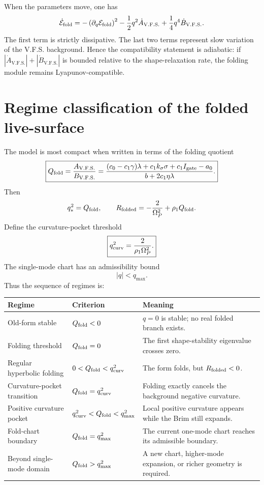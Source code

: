 \documentclass[11pt,a4paper]{article}
\newcommand{\VFS}{\ensuremath{\mathrm{V.F.S.}}}
\newcommand{\Op}{\Omega_P}
\newcommand{\Igate}{I_{\rm gate}}
\theoremstyle{plain}
\theoremstyle{remark}
\theoremstyle{definition}
\begin{document}
When the parameters move, one has
\[
\dot{\mathcal E}_{\rm fold}
=
-\left(\partial_q\mathcal E_{\rm fold}\right)^2
-\frac12q^2\dot A_{\VFS}
+\frac14q^4\dot B_{\VFS}.
\]
The first term is strictly dissipative. The last two terms represent slow variation of the V.F.S.
background. Hence the compatibility statement is adiabatic: if $|\dot A_{\VFS}|+|\dot B_{\VFS}|$ is
bounded relative to the shape-relaxation rate, the folding module remains Lyapunov-compatible.

\begin{center}
\end{center}


\section{Regime classification of the folded live-surface}
The model is most compact when written in terms of the folding quotient
\[
\boxed{
Q_{\rm fold}
=
\frac{A_{\VFS}}{B_{\VFS}}
=
\frac{(c_0-c_1\gamma)\lambda+c_1k_\sigma\sigma+c_1\Igate-a_0}
{b+2c_1\eta\lambda}.
}
\]
Then
\[
q_\ast^2=Q_{\rm fold},
\qquad
R_{\rm folded}=-\frac{2}{\Op^2}+\rho_1Q_{\rm fold}.
\]
Define the curvature-pocket threshold
\[
\boxed{
q_{\rm curv}^2=\frac{2}{\rho_1\Op^2}.
}
\]
The single-mode chart has an admissibility bound
\[
|q|<q_{\max}.
\]
Thus the sequence of regimes is:

\begin{center}
\begin{longtable}{@{}L{0.28\textwidth}L{0.30\textwidth}L{0.30\textwidth}@{}}
\toprule
Regime & Criterion & Meaning \\
\midrule
Old-form stable & $Q_{\rm fold}<0$ & $q=0$ is stable; no real folded branch exists. \\
Folding threshold & $Q_{\rm fold}=0$ & The first shape-stability eigenvalue crosses zero. \\
Regular hyperbolic folding & $0<Q_{\rm fold}<q_{\rm curv}^2$ & The form folds, but $R_{\rm folded}<0$. \\
Curvature-pocket transition & $Q_{\rm fold}=q_{\rm curv}^2$ & Folding exactly cancels the background negative curvature. \\
Positive curvature pocket & $q_{\rm curv}^2<Q_{\rm fold}<q_{\max}^2$ & Local positive curvature appears while the Brim still expands. \\
Fold-chart boundary & $Q_{\rm fold}=q_{\max}^2$ & The current one-mode chart reaches its admissible boundary. \\
Beyond single-mode domain & $Q_{\rm fold}>q_{\max}^2$ & A new chart, higher-mode expansion, or richer geometry is required. \\
\bottomrule
\end{longtable}
\end{center}
\end{document}
